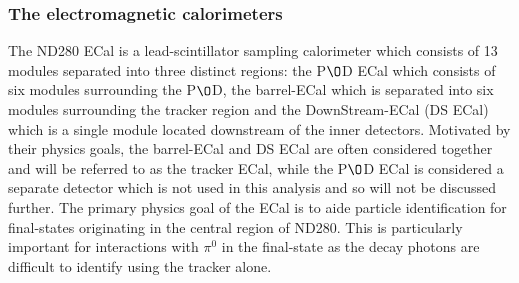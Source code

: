 \subsubsection{The electromagnetic calorimeters}
\label{subsubsec:ecal}
The ND280 ECal is a lead-scintillator sampling calorimeter which consists of 13 modules separated into three distinct regions: the P$\O$D ECal which consists of six modules surrounding the P$\O$D, the barrel-ECal which is separated into six modules surrounding the tracker region and the DownStream-ECal (DS ECal) which is a single module located downstream of the inner detectors.  Motivated by their physics goals, the barrel-ECal and DS ECal are often considered together and will be referred to as the tracker ECal, while the P$\O$D ECal is considered a separate detector which is not used in this analysis and so will not be discussed further.  The primary physics goal of the ECal is to aide particle identification for final-states originating in the central region of ND280.  This is particularly important for interactions with $\pi^0$ in the final-state as the decay photons are difficult to identify using the tracker alone.
\newline
\newline
